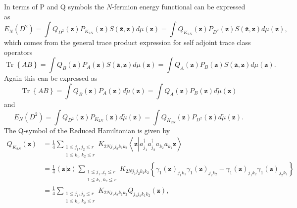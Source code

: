 \documentclass[aps,preprint]{revtex4}%
\begin{document}
In terms of P and Q symbols the $N$-fermion energy functional can be expressed
as
\begin{equation}
E_{N}\left(  D^{2}\right)  =\int Q_{D^{2}}\left(  \mathbf{z}\right)
P_{K_{2N}}\left(  \mathbf{z}\right)  S\left(  \mathbf{\bar{z},z}\right)
d\mu\left(  \mathbf{z}\right)  =\int Q_{K_{2N}}\left(  \mathbf{z}\right)
P_{D^{2}}\left(  \mathbf{z}\right)  S\left(  \mathbf{\bar{z},z}\right)
d\mu\left(  \mathbf{z}\right)  ,
\end{equation}
which comes from the general trace product expression for self adjoint trace
class operators
\begin{equation}
\operatorname*{Tr}\left\{  AB\right\}  =\int Q_{B}\left(  \mathbf{z}\right)
P_{A}\left(  \mathbf{z}\right)  S\left(  \mathbf{\bar{z},z}\right)
d\mu\left(  \mathbf{z}\right)  =\int Q_{A}\left(  \mathbf{z}\right)
P_{B}\left(  \mathbf{z}\right)  S\left(  \mathbf{\bar{z},z}\right)
d\mu\left(  \mathbf{z}\right)  .\nonumber
\end{equation}
Again this can be expressed as
\begin{equation}
\operatorname*{Tr}\left\{  AB\right\}  =\int Q_{B}\left(  \mathbf{z}\right)
P_{A}\left(  \mathbf{z}\right)  d\tilde{\mu}\left(  \mathbf{z}\right)  =\int
Q_{A}\left(  \mathbf{z}\right)  P_{B}\left(  \mathbf{z}\right)  d\tilde{\mu
}\left(  \mathbf{z}\right)
\end{equation}
and%
\begin{equation}
E_{N}\left(  D^{2}\right)  =\int Q_{D^{2}}\left(  \mathbf{z}\right)
P_{K_{2N}}\left(  \mathbf{z}\right)  d\tilde{\mu}\left(  \mathbf{z}\right)
=\int Q_{K_{2N}}\left(  \mathbf{z}\right)  P_{D^{2}}\left(  \mathbf{z}\right)
d\tilde{\mu}\left(  \mathbf{z}\right)  .
\end{equation}
The Q-symbol of the Reduced Hamiltonian is given by
\begin{align}
Q_{K_{2N}}\left(  \mathbf{z}\right)   &  =\frac{1}{4}\sum_{\substack{1\leq
j_{1},j_{2}\leq r\\1\leq k_{1},k_{2}\leq r}}K_{2Nj_{1}j_{2}k_{1}k_{2}%
}\left\langle \mathbf{z}\left\vert a_{j_{1}}^{\dagger}a_{j_{2}}^{\dagger
}a_{k_{2}}a_{k_{1}}\mathbf{z}\right.  \right\rangle \nonumber\\
&  =\frac{1}{4}\left\langle \mathbf{z}\left\vert \mathbf{z}\right.
\right\rangle \sum_{\substack{1\leq j_{1},j_{2}\leq r\\1\leq k_{1},k_{2}\leq
r}}K_{2Nj_{1}j_{2}k_{1}k_{2}}\left\{  \gamma_{1}\left(  \mathbf{z}\right)
_{j_{1}k_{1}}\gamma_{1}\left(  \mathbf{z}\right)  _{j_{2}k_{2}}-\gamma
_{1}\left(  \mathbf{z}\right)  _{j_{1}k_{2}}\gamma_{1}\left(  \mathbf{z}%
\right)  _{j_{2}k_{1}}\right\} \nonumber\\
&  =\frac{1}{4}\sum_{\substack{1\leq j_{1},j_{2}\leq r\\1\leq k_{1},k_{2}\leq
r}}K_{2Nj_{1}j_{2}k_{1}k_{2}}Q_{j_{1}j_{2}k_{1}k_{2}}\left(  \mathbf{z}%
\right)  ,
\end{align}
\end{document}
